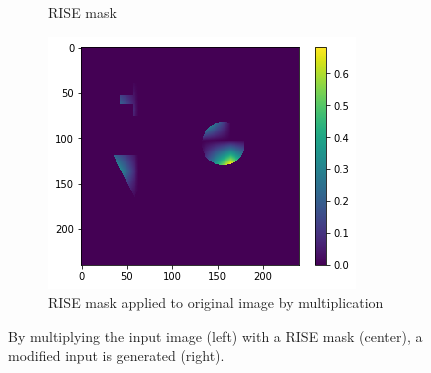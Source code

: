 \begin{figure}[H]
\begin{subfigure}[t]{.32\textwidth}
        \caption{RISE mask}
    \end{subfigure}\hfill%
    \begin{subfigure}[t]{.32\textwidth}
        \centering
        \includegraphics[width=\linewidth]{chapters/02_methods/images/rise/rise0_applied.png}
        \caption{RISE mask applied to original image by multiplication}
    \end{subfigure}
    \caption{By multiplying the input image (left) with a RISE mask (center), a modified input is generated (right).}
    \label{rise_mask0}
\end{figure}


